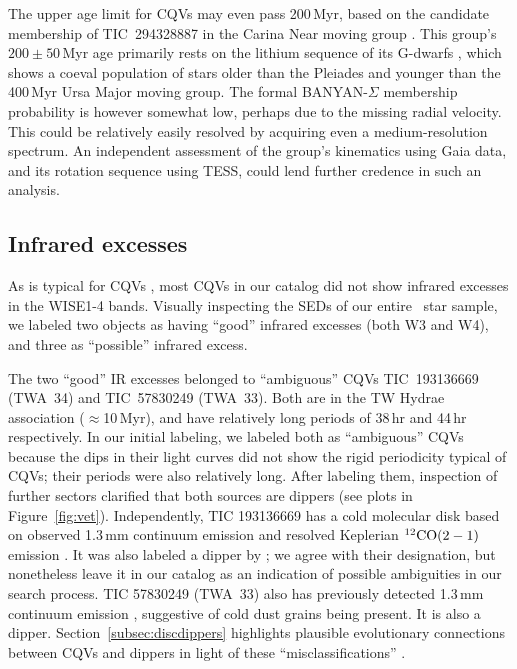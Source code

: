 \documentclass[11pt,twocolumn,tighten]{aastex63}
\begin{document}
The upper age limit for CQVs may even pass 200\,Myr, based on the
candidate membership of TIC~294328887 in the Carina Near moving group
\citep{2006ApJ...649L.115Z}.  This group's $200 \pm 50$\,Myr age
primarily rests on the lithium sequence of its G-dwarfs
\citep{2006ApJ...649L.115Z}, which shows a coeval population of stars
older than the Pleiades and younger than the 400\,Myr Ursa Major
moving group.  The formal BANYAN-$\Sigma$ membership probability is
however somewhat low, perhaps due to the missing radial velocity.
This could be relatively easily resolved by acquiring even a
medium-resolution spectrum.
An independent assessment of the group's kinematics using Gaia data,
and its rotation sequence using TESS, could lend further credence in
such an analysis.


\subsection{Infrared excesses}
\label{subsec:irexcess}

As is typical for CQVs \citep{2017AJ....153..152S}, most CQVs in our
catalog did not show infrared excesses in the WISE1-4 bands.
Visually inspecting the SEDs of our entire \ncpvsfound\ star sample,
we labeled two objects as having ``good'' infrared excesses (both W3
and W4), and three as ``possible'' infrared excess.

The two ``good'' IR excesses belonged to ``ambiguous'' CQVs
TIC~193136669 (TWA~34) and TIC~57830249 (TWA~33).  Both are in the TW
Hydrae association ($\approx$10\,Myr), and have relatively long
periods of 38\,hr and 44\,hr respectively.  In our initial labeling,
we labeled both as ``ambiguous'' CQVs because the dips in their light
curves did not show the rigid periodicity typical of CQVs;  their
periods were also relatively long.  After labeling them, inspection
of further sectors clarified that both sources are dippers (see plots
in Figure~\ref{fig:vet}).  Independently, TIC 193136669 has a cold
molecular disk based on observed 1.3\,mm continuum emission and
resolved Keplerian $^{12}{\rm CO}(2-1)$ emission
\citep{2015A&A...582L...5R}.  It was also labeled a dipper by
\citet{2022ApJS..263...14C}; we agree with their designation, but
nonetheless leave it in our catalog as an indication of possible
ambiguities in our search process.  TIC 57830249 (TWA~33) also has
previously detected 1.3\,mm continuum emission
\citep{2015A&A...582L...5R}, suggestive of cold dust grains being
present.  It is also a dipper.
Section~\ref{subsec:discdippers} highlights plausible evolutionary
connections between CQVs and dippers in light of these
``misclassifications'' .
\end{document}
